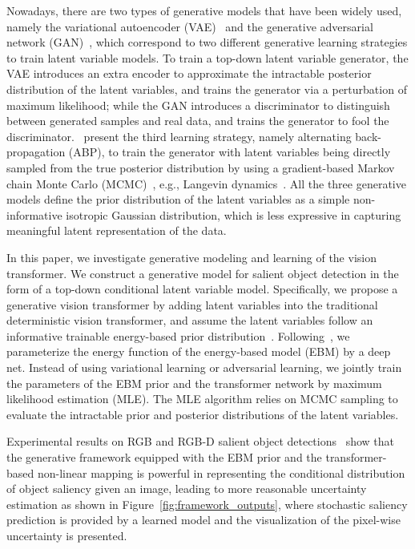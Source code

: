 \documentclass{article}
\begin{document}
Nowadays, there are two types of generative models that have been widely used, namely the variational autoencoder (VAE)~\cite{vae_bayes_kumar} and the generative adversarial network (GAN)~\cite{GAN_nips},  which correspond to two different generative learning strategies to train latent variable models. To train a top-down latent variable generator, the VAE introduces an extra encoder to approximate the intractable posterior distribution of the latent variables, and trains the generator via a perturbation of maximum likelihood; while the GAN introduces a discriminator to distinguish between generated samples and real data, and trains the generator to fool the discriminator.~\cite{abp,xie2019learning} present the third learning strategy, namely alternating back-propagation (ABP), to train the generator 
with latent variables being directly sampled from the true posterior distribution by using a gradient-based Markov chain Monte Carlo (MCMC)~\cite{liu2008monte}, e.g., Langevin dynamics~\cite{neal2011mcmc,WellingT11,DubeyRWPSX16}. All the three generative models define the prior distribution of the latent variables as a simple non-informative isotropic Gaussian distribution, which is less expressive in capturing meaningful latent representation of the data.

In this paper, we investigate generative modeling and learning of the vision transformer. We construct a generative model for salient object detection in the form of a top-down conditional latent variable model. Specifically, we propose a generative vision transformer by adding latent variables into the traditional deterministic vision transformer, and assume the latent variables follow an informative trainable energy-based prior distribution~\cite{ebm_prior,PangW21}. Following~\cite{xie2016theory}, we parameterize the energy function of the energy-based model (EBM) by a deep net. Instead of using variational learning or adversarial learning, we jointly train the parameters of the EBM prior and the transformer network by maximum likelihood estimation (MLE). The MLE algorithm relies on MCMC sampling to evaluate the intractable prior and posterior distributions of the latent variables.   

Experimental results on RGB and RGB-D salient object detections~\cite{wei2020f3net,scrn_sal,ucnet_sal,fan2020bbs} show that the generative framework equipped with the EBM prior and the transformer-based non-linear mapping is powerful in representing the conditional distribution of object saliency given an image, leading to more reasonable uncertainty estimation as shown in Figure~\ref{fig:framework_outputs}, where stochastic saliency prediction is provided by a learned model and the visualization of the pixel-wise uncertainty is presented.   
\end{document}
